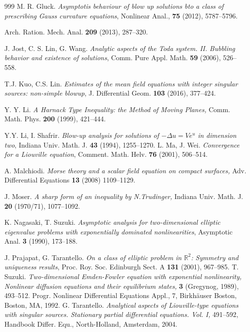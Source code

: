 \documentclass[reqno,11pt]{amsart}
\theoremstyle{definition}
\numberwithin{equation}{section}
\newcommand{\R}{\mathbb{R}}
\renewcommand{\(}{\left(}
\renewcommand{\)}{\right)}
\renewcommand{\[}{\left[}
\renewcommand{\]}{\right]}
\begin{document}
{\begin{thebibliography}{999}
 M. R. Gluck. {\em Asymptotis behaviour of blow up solutions bto a class of prescribing Gauss curvature equations}, Nonlinear Anal., {\bf 75} (2012), 5787--5796.

{Arch. Ration. Mech. Anal. {\bf 209} (2013), 287--320.}


 J. Jost, C. S. Lin, G. Wang. {\em Analytic aspects of the Toda system. II. Bubbling
behavior and existence of solutions}, Comm. Pure Appl. Math. {\bf 59} (2006), 
526--558.

T.J. Kuo,  C.S. Lin. {\em  Estimates of the mean field equations with integer singular sources: non-simple blowup}, J. Differential Geom. {\bf 103} (2016), 377--424.

 Y. Y. Li. {\em A Harnack Type Inequality: the Method of Moving Planes,} Comm.
Math. Phys. {\bf 200} (1999), 421--444.

 Y.Y. Li, I. Shafrir. {\em Blow-up analysis for solutions of $-\Delta u = V e^u$ in dimension two}, Indiana Univ. Math. J. {\bf 43} (1994),  1255--1270.
 L. Ma, J. Wei. {\em Convergence for a Liouville equation}, Comment. Math. Helv. {\bf 76} (2001),
506--514.

 A. Malchiodi. {\em Morse theory and a scalar field equation on compact surfaces,} Adv. Differential Equations {\bf 13} (2008)
1109--1129.

 J. Moser. {\textit{A sharp form of an inequality by N.Trudinger,}}
 Indiana Univ. Math. J.  {\bf 20} (1970/71), 1077--1092.

 K. Nagasaki, T. Suzuki. {\em Asymptotic analysis for two-dimensional elliptic eigenvalue problems
with exponentially dominated nonlinearities}, Asymptotic Anal. {\bf 3} (1990),  173--188.

 J.  Prajapat, G. Tarantello. {\em On a class of elliptic problem in $\R^2$:  Symmetry and uniqueness results},
Proc. Roy. Soc. Edinburgh Sect. A
{\bf 131}
(2001), 967--985.
 T. Suzuki. {\em Two-dimensional Emden-Fowler equation with exponential nonlinearity, Nonlinear diffusion equations and their equilibrium states,} {\bf 3} (Gregynog, 1989), 493--512. Progr. Nonlinear Differential Equations Appl., 7, Birkh\"auser Boston, Boston, MA, 1992.
 G. Tarantello. {\em  Analytical aspects of Liouville-type equations with singular sources. Stationary partial differential equations. Vol. I,} 491--592, Handbook Differ. Equ., North-Holland, Amsterdam, 2004.


\end{thebibliography}}
\end{document}
